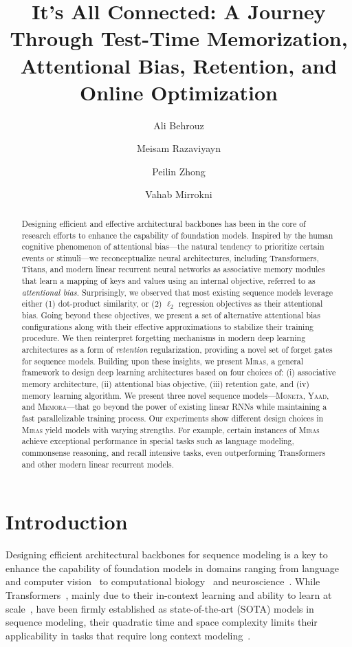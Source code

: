 \documentclass{article}
\title{\textcolor{c2}{It's All Connected}: A Journey Through Test-Time Memorization, Attentional Bias, Retention, and Online Optimization}
\author[$^\dagger$]{Ali Behrouz}
\author[$^\dagger$]{Meisam Razaviyayn}
\author[$^\dagger$]{Peilin Zhong}
\author[$^\dagger$]{Vahab Mirrokni}
\affil[$^\dagger$]{Google Research}
\affil[ ]{{\small \texttt{\{alibehrouz, razaviyayn, peilinz, mirrokni\}@google.com}}}
\date{}
\newcommand{\citep}{\parencite}
\newcommand{\framework}[0]{\textsc{Miras}}
\newcommand{\ymodel}[0]{\textsc{Yaad}}
\newcommand{\mmodel}[0]{\textsc{Moneta}}
\newcommand{\xmodel}[0]{\textsc{Memora}}
\theoremstyle{plain}
\theoremstyle{definition}
\theoremstyle{remark}
\begin{document}
\maketitle



\begin{abstract}
Designing efficient and effective architectural backbones has been in the core of research efforts to enhance the capability of foundation models. Inspired by the human cognitive phenomenon of attentional bias—the natural tendency to prioritize certain events or stimuli—we reconceptualize neural architectures, including Transformers, Titans, and modern linear recurrent neural networks as associative memory modules that learn a mapping of keys and values using an internal objective, referred to as \emph{attentional bias}. Surprisingly, we observed that most existing sequence models leverage either (1) dot-product similarity, or (2) $\ell_2$ regression objectives as their attentional bias. Going beyond these  objectives, we present a set of alternative attentional bias configurations along with their effective approximations to stabilize their training procedure. We then reinterpret forgetting mechanisms in modern deep learning architectures as a form of \emph{retention} regularization, providing a novel set of forget gates for sequence models. Building upon these insights, we present \framework{}, a general framework to design deep learning architectures based on four choices of: (i) associative memory architecture, (ii) attentional bias objective, (iii) retention gate, and (iv) memory learning algorithm. We present three novel sequence models—\mmodel, \ymodel, and \xmodel—that go beyond the power of existing linear RNNs while maintaining a fast parallelizable training process. Our experiments show different design choices in \framework{} yield models with varying strengths. 
 For example, certain  instances of \framework{} achieve exceptional performance in special tasks such as language modeling, commonsense reasoning, and recall intensive tasks, even outperforming Transformers and other modern linear recurrent models. 
\end{abstract}






\section{Introduction}\label{sec:intro}
Designing efficient architectural backbones for sequence modeling is a key to enhance the capability of foundation models in domains ranging from language~\citep{Vaswani+2017, behrouz2024titans} and computer vision~\citep{dosovitskiy2020image} to computational biology~\citep{wang2024long} and neuroscience~\citep{behrouz2024unsupervised}. While Transformers~\citep{Vaswani+2017}, mainly due to their in-context learning and ability to learn at scale~\citep{kaplan2020scaling}, have been firmly established as state-of-the-art (SOTA) models in sequence modeling, their quadratic time and space complexity limits their applicability in tasks that require long context modeling~\citep{dalal2025one, liu2024lost, li2024survey}. 
\end{document}

